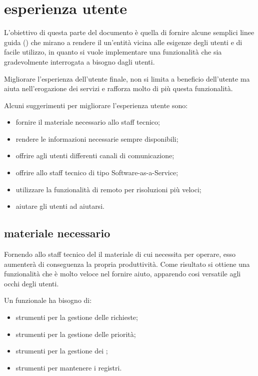 %
%
\section[Esperienza utente]{esperienza utente}
\label{sd-users-experience}
L'obiettivo di questa parte del documento è quella di fornire alcune semplici linee guida () che mirano a rendere il  un'entità vicina alle esigenze degli utenti e di facile utilizzo, in quanto si vuole implementare una funzionalità che sia gradevolmente interrogata a bisogno dagli utenti.

Migliorare l'esperienza dell'utente finale, non si limita a beneficio dell'utente ma aiuta nell'erogazione dei servizi e rafforza molto di più questa funzionalità.

Alcuni suggerimenti per migliorare l'esperienza utente sono:

\begin{itemize}
\item{fornire il materiale necessario allo staff tecnico;}
\item{rendere le informazioni necessarie sempre disponibili;}
\item{offrire agli utenti differenti canali di comunicazione;}
\item{offrire allo staff tecnico  di tipo \acs{Software-as-a-Service};}
\item{utilizzare la funzionalità di  remoto per risoluzioni più veloci;}
\item{aiutare gli utenti ad aiutarsi.}
\end{itemize}

\subsection[Materiale necessario]{materiale necessario}
\label{sd-users-experience-material}
Fornendo allo staff tecnico del  il materiale di cui necessita per operare, esso aumenterà di conseguenza la propria produttività. Come risultato si ottiene una funzionalità che è molto veloce nel fornire aiuto, apparendo cosi versatile agli occhi degli utenti.

Un  funzionale ha bisogno di:

\begin{itemize}
\item{strumenti per la gestione delle richieste;}
\item{strumenti per la gestione delle priorità;}
\item{strumenti per la gestione dei ;}
\item{strumenti per mantenere i registri.}
\end{itemize}

